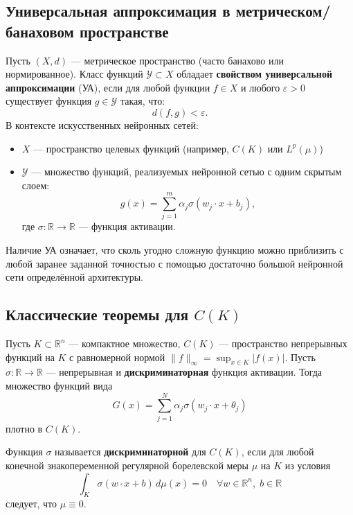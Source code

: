 \documentclass[../NDCNNAI_main.tex]{subfiles}
\begin{document}
\subsection{Универсальная аппроксимация в метрическом/банаховом пространстве}

\begin{definition}
Пусть $(X, d)$ — метрическое пространство (часто банахово или нормированное). Класс функций $\mathcal{Y} \subset X$ обладает \textbf{свойством универсальной аппроксимации} (УА), если для любой функции $f \in X$ и любого $\varepsilon > 0$ существует функция $g \in \mathcal{Y}$ такая, что:
\[
d(f, g) < \varepsilon.
\]
В контексте искусственных нейронных сетей:
\begin{itemize}
    \item $X$ — пространство целевых функций (например, $C(K)$ или $L^p(\mu)$)
    \item $\mathcal{Y}$ — множество функций, реализуемых нейронной сетью с одним скрытым слоем:
    \[
    g(x) = \sum_{j=1}^{m} \alpha_j \sigma(w_j \cdot x + b_j),
    \]
    где $\sigma: \mathbb{R} \to \mathbb{R}$ — функция активации.
\end{itemize}
\end{definition}

\begin{remark}
Наличие УА означает, что сколь угодно сложную функцию можно приблизить с любой заранее заданной точностью с помощью достаточно большой нейронной сети определённой архитектуры.
\end{remark}

\subsection{Классические теоремы для $C(K)$}

\begin{theorem}[Цыбенко, 1989]
Пусть $K \subset \mathbb{R}^n$ — компактное множество, $C(K)$ — пространство непрерывных функций на $K$ с равномерной нормой $\|f\|_\infty = \sup_{x \in K} |f(x)|$. Пусть $\sigma: \mathbb{R} \to \mathbb{R}$ — непрерывная и \textbf{дискриминаторная} функция активации. Тогда множество функций вида
\[
G(x) = \sum_{j=1}^{N} \alpha_j \sigma(w_j \cdot x + \theta_j)
\]
плотно в $C(K)$.
\end{theorem}

\begin{definition}
Функция $\sigma$ называется \textbf{дискриминаторной} для $C(K)$, если для любой конечной знакопеременной регулярной борелевской меры $\mu$ на $K$ из условия
\[
\int_K \sigma(w \cdot x + b) \, d\mu(x) = 0 \quad \forall w \in \mathbb{R}^n, \; b \in \mathbb{R}
\]
следует, что $\mu \equiv 0$.
\end{definition}
\end{document}
